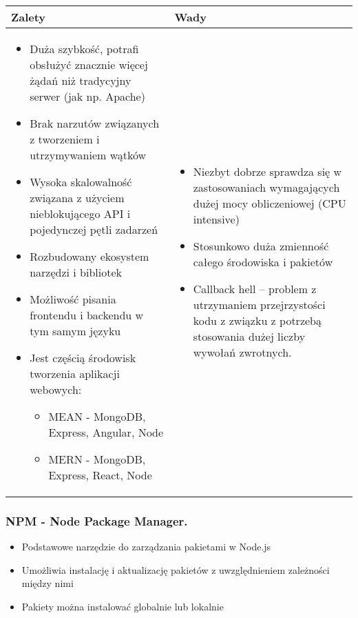 \documentclass[../main.tex]{subfiles}
\begin{document}
    \begin{table}[H]
        \begin{center}
            \begin{tabular}{| p{8cm} | p{8cm}| }
                \hline
                \textbf{Zalety} & \textbf{Wady}\\
                \hline
                \hline
                \begin{itemize}
                    \item Duża szybkość, potrafi obsłużyć znacznie więcej żądań niż tradycyjny serwer (jak np. Apache)
                    \item Brak narzutów związanych z tworzeniem i utrzymywaniem wątków
                    \item Wysoka skalowalność związana z użyciem nieblokującego API i pojedynczej pętli zadarzeń
                    \item Rozbudowany ekosystem narzędzi i bibliotek
                    \item Możliwość pisania frontendu i backendu w tym samym języku
                    \item Jest częścią środowisk tworzenia aplikacji webowych:
                    \begin{itemize}
                        \item MEAN - MongoDB, Express, Angular, Node
                        \item MERN - MongoDB, Express, React, Node
                    \end{itemize}
                \end{itemize}
                &
                \begin{itemize}
                    \item Niezbyt dobrze sprawdza się w zastosowaniach wymagających dużej mocy obliczeniowej (CPU intensive)
                    \item Stosunkowo duża zmienność całego środowiska i pakietów
                    \item Callback hell – problem z utrzymaniem przejrzystości kodu z związku z potrzebą stosowania dużej liczby wywołań zwrotnych.
                \end{itemize}\\
                \hline
            \end{tabular}
        \end{center}
    \end{table}

    \subsubsection{NPM - Node Package Manager.}
    \begin{itemize}
        \item Podstawowe narzędzie do zarządzania pakietami w Node.js
        \item Umożliwia instalację i aktualizację pakietów z uwzględnieniem zależności między nimi
        \item Pakiety można instalować globalnie lub lokalnie
    \end{itemize}
\end{document}
